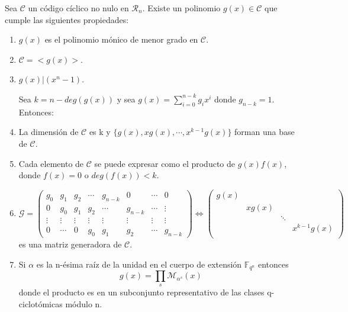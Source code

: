 \begin{theorem}
\label{th:base_ciclicos}
Sea $\mathcal{C} $ un código cíclico no nulo en $\mathcal{R}_n$. Existe un polinomio $g(x) \in \mathcal{C}$ que cumple las siguientes propiedades:
\begin{enumerate}
	\item $g(x)$ es el polinomio mónico de menor grado en $\mathcal{C}$.
	\item $\mathcal{C} = <g(x)>$.
	\item $g(x) | (x^n-1)$.
	
	Sea $k = n - deg(g(x))$ y sea $g(x) = \sum_{i=0}^{n-k}g_ix^i$ donde $g_{n-k} = 1$. Entonces:
	\item La dimensión de $\mathcal{C}$ es k y $\{g(x),xg(x),\cdots,x^{k-1}g(x)\}$ forman una base de $\mathcal{C}$.
	\item Cada elemento de $\mathcal{C}$ se puede expresar como el producto de $g(x)f(x)$, donde $f(x) = 0$ o $deg(f(x)) < k$.
	\item 	
	
	$\mathcal{G} = \begin{pmatrix}
			g_0 & g_1 & g_2 & \cdots & g_{n-k} & 0 & \cdots & 0 \\
			0 & g_0 & g_1 & g_2 & \cdots & g_{n-k} & \cdots & \vdots \\
			\vdots & \vdots & \vdots & \vdots & \vdots &\vdots & \vdots & \vdots \\
			0 & \cdots & 0 & g_0 & g_1 & g_2 & \cdots & g_{n-k} 
	\end{pmatrix} \Leftrightarrow \begin{pmatrix}
			g(x) &  &  &   \\
			 & xg(x)  &  &   \\
			 &  & \ddots &   \\
			 &  &  & x^{k-1}g(x)  \\
	\end{pmatrix}$ 
	es una matriz generadora de $\mathcal{C}$.
	\item Si $\alpha$ es la n-ésima raíz de la unidad en el cuerpo de extensión $\mathbb{F}_{q^n}$ entonces \[ 
	g(x) = \prod_s \mathcal{M}_{\alpha^s} (x)
	\]
	donde el producto es en un subconjunto representativo de las clases q-ciclotómicas módulo n.	
\end{enumerate}
\end{theorem}

